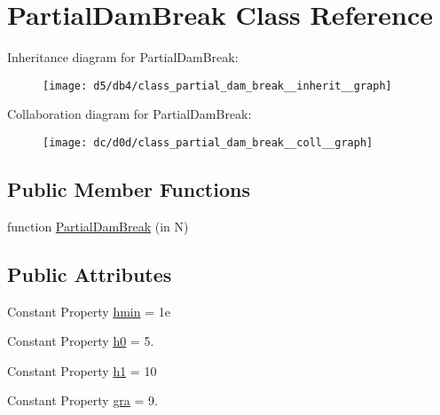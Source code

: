 \hypertarget{class_partial_dam_break}{}\section{Partial\+Dam\+Break Class Reference}
\label{class_partial_dam_break}


Inheritance diagram for Partial\+Dam\+Break\+:
\nopagebreak
\begin{figure}[H]
\begin{center}
\leavevmode
\texttt{[image: d5/db4/class\_partial\_dam\_break\_\_inherit\_\_graph]}
\end{center}
\end{figure}


Collaboration diagram for Partial\+Dam\+Break\+:
\nopagebreak
\begin{figure}[H]
\begin{center}
\leavevmode
\texttt{[image: dc/d0d/class\_partial\_dam\_break\_\_coll\_\_graph]}
\end{center}
\end{figure}
\subsection*{Public Member Functions}
\begin{DoxyCompactItemize}
\item 
function \hyperlink{class_partial_dam_break_a1c7d8eb0ac378cd2c2fb5157f1ad216d}{Partial\+Dam\+Break} (in N)
\end{DoxyCompactItemize}
\subsection*{Public Attributes}
\begin{DoxyCompactItemize}
\item 
Constant Property \hyperlink{class_partial_dam_break_a9c203f21ba2f5283672ba2e1e6101466}{hmin} = 1e
\item 
Constant Property \hyperlink{class_partial_dam_break_a317b41054953987abce4544b0030106d}{h0} = 5.
\item 
Constant Property \hyperlink{class_partial_dam_break_a717a29a3eefbf7b50f3b85f2f5dd4915}{h1} = 10
\item 
Constant Property \hyperlink{class_partial_dam_break_abb4c3a191db052359fbaac0a0db250c9}{gra} = 9.
\end{DoxyCompactItemize}
